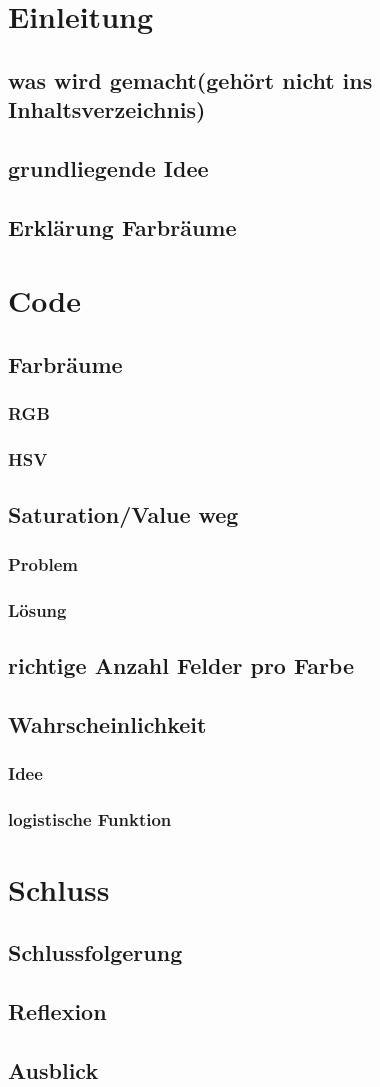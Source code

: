 \documentclass[a4paper, 11pt]{article}
\begin{document}
\tableofcontents
\section{Einleitung}
\subsection{was wird gemacht(gehört nicht ins Inhaltsverzeichnis)}
\subsection{grundliegende Idee}
\subsection{Erklärung Farbräume}
\section{Code}
\subsection{Farbräume}
\subsubsection{RGB}
\subsubsection{HSV}
\subsection{Saturation/Value weg}
\subsubsection{Problem}
\subsubsection{Lösung}
\subsection{richtige Anzahl Felder pro Farbe}
\subsection{Wahrscheinlichkeit}
\subsubsection{Idee}
\subsubsection{logistische Funktion}
\section{Schluss}
\subsection{Schlussfolgerung}
\subsection{Reflexion}
\subsection{Ausblick}
\end{document}
